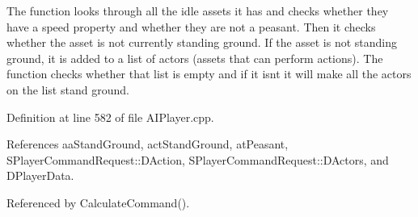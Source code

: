 The function looks through all the idle assets it has and checks whether they have a speed property and whether they are not a peasant. Then it checks whether the asset is not currently standing ground. If the asset is not standing ground, it is added to a list of actors (assets that can perform actions). The function checks whether that list is empty and if it isn\textquotesingle{}t it will make all the actors on the list stand ground. 

Definition at line 582 of file A\+I\+Player.\+cpp.



References aa\+Stand\+Ground, act\+Stand\+Ground, at\+Peasant, S\+Player\+Command\+Request\+::\+D\+Action, S\+Player\+Command\+Request\+::\+D\+Actors, and D\+Player\+Data.



Referenced by Calculate\+Command().


